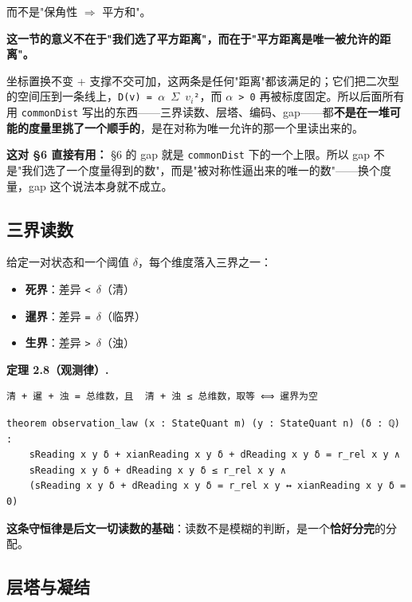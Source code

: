 \documentclass[11pt,a4paper]{ctexart}
\begin{document}
而不是"保角性 \ensuremath{\Longrightarrow} 平方和"。

\textbf{这一节的意义不在于"我们选了平方距离"，而在于"平方距离是唯一被允许的距离"。}

坐标置换不变 + 支撑不交可加，这两条是任何"距离"都该满足的；它们把二次型的空间压到一条线上，\texttt{D(v) = \ensuremath{\alpha} \ensuremath{\Sigma} \ensuremath{v_{i}}²}，而 \texttt{\ensuremath{\alpha} > 0} 再被标度固定。所以后面所有用 \texttt{commonDist} 写出的东西——三界读数、层塔、编码、gap——都\textbf{不是在一堆可能的度量里挑了一个顺手的}，是在对称为唯一允许的那一个里读出来的。

\textbf{这对 §6 直接有用：} §6 的 gap 就是 \texttt{commonDist} 下的一个上限。所以 gap 不是"我们选了一个度量得到的数"，而是"被对称性逼出来的唯一的数"——换个度量，gap 这个说法本身就不成立。

\subsection{三界读数}

给定一对状态和一个阈值 \texttt{\ensuremath{\delta}}，每个维度落入三界之一：

\begin{itemize}
\item \textbf{死界}：差异 \texttt{< \ensuremath{\delta}}（清）
\item \textbf{暹界}：差异 \texttt{= \ensuremath{\delta}}（临界）
\item \textbf{生界}：差异 \texttt{> \ensuremath{\delta}}（浊）
\end{itemize}

\textbf{定理 2.8（观测律）.}

\begin{lstlisting}
清 + 暹 + 浊 = 总维数，且  清 + 浊 ≤ 总维数，取等 ⟺ 暹界为空
\end{lstlisting}

\begin{lstlisting}
theorem observation_law (x : StateQuant m) (y : StateQuant n) (δ : ℚ) :
    sReading x y δ + xianReading x y δ + dReading x y δ = r_rel x y ∧
    sReading x y δ + dReading x y δ ≤ r_rel x y ∧
    (sReading x y δ + dReading x y δ = r_rel x y ↔ xianReading x y δ = 0)
\end{lstlisting}

\textbf{这条守恒律是后文一切读数的基础}：读数不是模糊的判断，是一个\textbf{恰好分完}的分配。

\subsection{层塔与凝结}
\end{document}
